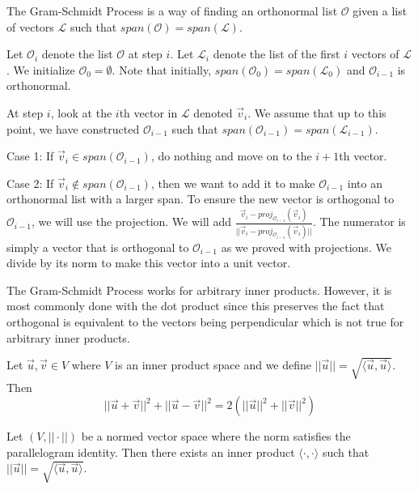 \begin{definition}
    The Gram-Schmidt Process is a way of finding an orthonormal list $\mathcal{O}$ given a list of vectors $\mathcal{L}$ such that $span(\mathcal{O})=span(\mathcal{L})$.

    Let $\mathcal{O}_i$ denote the list $\mathcal{O}$ at step $i$. Let $\mathcal{L}_i$ denote the list of the first $i$ vectors of $\mathcal{L}$. We initialize $\mathcal{O}_0=\emptyset$. Note that initially, $span(\mathcal{O}_0)=span(\mathcal{L}_0)$ and $\mathcal{O}_{i-1}$ is orthonormal.

    At step $i$, look at the $i$th vector in $\mathcal{L}$ denoted $\vec{v}_i$. We assume that up to this point, we have constructed $\mathcal{O}_{i-1}$ such that $span(\mathcal{O}_{i-1})=span(\mathcal{L}_{i-1})$.

    Case 1: If $\vec{v}_i\in span(\mathcal{O}_{i-1})$, do nothing and move on to the $i+1$th vector.

    Case 2: If $\vec{v}_i\notin span(\mathcal{O}_{i-1})$, then we want to add it to make $\mathcal{O}_{i-1}$ into an orthonormal list with a larger span. To ensure the new vector is orthogonal to $\mathcal{O}_{i-1}$, we will use the projection. We will add $\frac{\vec{v}_i-proj_{\mathcal{O}_{i-1}}(\vec{v}_i)}{||\vec{v}_i-proj_{\mathcal{O}_{i-1}}(\vec{v}_i)||}$. The numerator is simply a vector that is orthogonal to $\mathcal{O}_{i-1}$ as we proved with projections. We divide by its norm to make this vector into a unit vector.
\end{definition}
\begin{remark}
    The Gram-Schmidt Process works for arbitrary inner products. However, it is most commonly done with the dot product since this preserves the fact that orthogonal is equivalent to the vectors being perpendicular which is not true for arbitrary inner products.
\end{remark}

\begin{theorem}
    Let $\vec{u},\vec{v}\in V$ where $V$ is an inner product space and we define $||\vec{u}||=\sqrt{\langle\vec{u},\vec{u}\rangle}$. Then
    $$||\vec{u}+\vec{v}||^2+||\vec{u}-\vec{v}||^2=2(||\vec{u}||^2+||\vec{v}||^2)$$
\end{theorem}

\begin{theorem}
    Let $(V,||\cdot||)$ be a normed vector space where the norm satisfies the parallelogram identity. Then there exists an inner product $\langle\cdot,\cdot\rangle$ such that $||\vec{u}||=\sqrt{\langle\vec{u},\vec{u}\rangle}$.
\end{theorem}

